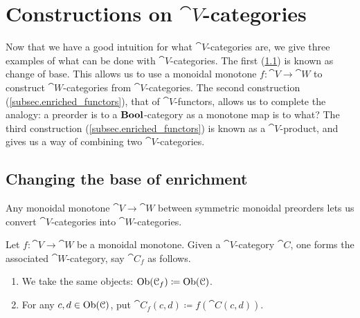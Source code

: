 \documentclass[7Sketches]{subfiles}
\begin{document}
%

\section{Constructions on $\cat{V}$-categories} %
\label{sec.vcat_constructions}

Now that we have a good intuition for what $\cat{V}$-categories are, we give
three examples of what can be done with $\cat{V}$-categories. The first
(\cref{subsec.change_base_mon_fun}) is known as change of base. This allows us
to use a monoidal monotone $f\colon \cat{V} \to \cat{W}$ to construct
$\cat{W}$-categories from $\cat{V}$-categories. The second construction
(\cref{subsec.enriched_functors}), that of $\cat{V}$-functors, allows us to
complete the analogy: a preorder is to a $\mathbf{Bool}$-category as a monotone map is to
what? The third construction (\cref{subsec.enriched_functors}) is known as a
$\cat{V}$-product, and gives us a way of combining two $\cat{V}$-categories.

\subsection{Changing the base of enrichment}%
\label{subsec.change_base_mon_fun}%
Any monoidal monotone $\cat{V}\to\cat{W}$ between symmetric monoidal preorders lets us convert $\cat{V}$-categories into $\cat{W}$-categories.

\begin{construction}%
\label{const.mon_fun_base_change}%
%
Let $f\colon\cat{V}\to\cat{W}$ be a monoidal monotone. Given a $\cat{V}$-category $\cat{C}$, one forms the associated $\cat{W}$-category, say $\cat{C}_f$ as follows.
\begin{enumerate}[label=(\roman*)]
	\item We take the same objects: $\operatorname{Ob}(\mathcal{C}_f)\coloneqq\operatorname{Ob}(\mathcal{C})$.
	\item For any $c,d\in\operatorname{Ob}(\mathcal{C})$, put $\cat{C}_f(c,d)\coloneqq f(\cat{C}(c,d))$.
\end{enumerate}
\end{construction}
\end{document}
